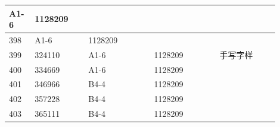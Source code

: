 \documentclass[UTF8,10pt,a4paper,fontset=fandol]{ctexart}
\newcommand{\fieldvalue}[1]{#1}
\newcommand{\handwritten}[1]{#1}
\begin{document}
\begin{center}
\begin{tabular}{|p{0.08\linewidth}|p{0.18\linewidth}|p{0.22\linewidth}|p{0.22\linewidth}|p{0.20\linewidth}|}
\fieldvalue{A1-6} &
\fieldvalue{1128209} & \\ \hline
\fieldvalue{398} &
\fieldvalue{A1-6} &
\fieldvalue{1128209} & \\ \hline
\fieldvalue{399} &
\fieldvalue{324110} &
\fieldvalue{A1-6} &
\fieldvalue{1128209} &
\fieldvalue{\handwritten{手写字样}} \\ \hline
\fieldvalue{400} &
\fieldvalue{334669} &
\fieldvalue{A1-6} &
\fieldvalue{1128209} & \\ \hline
\fieldvalue{401} &
\fieldvalue{346966} &
\fieldvalue{B4-4} &
\fieldvalue{1128209} & \\ \hline
\fieldvalue{402} &
\fieldvalue{357228} &
\fieldvalue{B4-4} &
\fieldvalue{1128209} & \\ \hline
\fieldvalue{403} &
\fieldvalue{365111} &
\fieldvalue{B4-4} &
\fieldvalue{1128209} & \\ \hline

\end{tabular}
\end{center}
\end{document}

